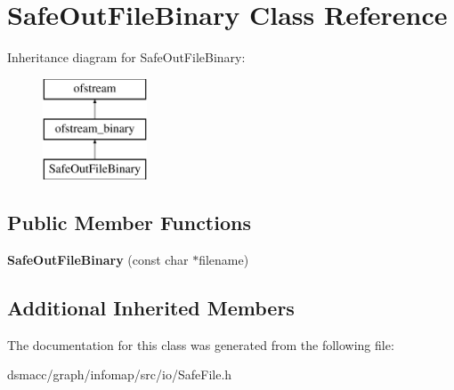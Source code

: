 \hypertarget{classSafeOutFileBinary}{}\section{Safe\+Out\+File\+Binary Class Reference}
\label{classSafeOutFileBinary}
Inheritance diagram for Safe\+Out\+File\+Binary\+:\begin{figure}[H]
\begin{center}
\leavevmode
\includegraphics[height=3.000000cm]{classSafeOutFileBinary}
\end{center}
\end{figure}
\subsection*{Public Member Functions}
\begin{DoxyCompactItemize}
\item 
\mbox{\label{classSafeOutFileBinary_a0847717a0de258a409393786ba2f8830}} 
{\bfseries Safe\+Out\+File\+Binary} (const char $\ast$filename)
\end{DoxyCompactItemize}
\subsection*{Additional Inherited Members}


The documentation for this class was generated from the following file\+:\begin{DoxyCompactItemize}
\item 
dsmacc/graph/infomap/src/io/Safe\+File.\+h\end{DoxyCompactItemize}
